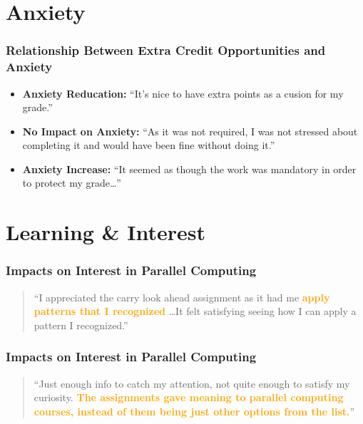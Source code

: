 \documentclass{beamer}
\begin{document}
\section{Anxiety}

\begin{frame}
    \frametitle{Relationship Between Extra Credit Opportunities and Anxiety}

    \begin{figure}
      
    \end{figure}

    \begin{itemize}
      \item \textbf{Anxiety Reducation:}
          ``It's nice to have extra points as a cusion for my grade.''
      \item \textbf{No Impact on Anxiety:}
          ``As it was not required, I was not stressed about completing it and would have been fine without doing it.''
      \item \textbf{Anxiety Increase:}
          ``It seemed as though the work was mandatory in order to protect my grade\ldots''
    \end{itemize}

\end{frame}

\section{Learning \&  Interest}

\begin{frame}
    \frametitle{Impacts on Interest in Parallel Computing}

    \begin{figure}
      
    \end{figure}
    \vfill
    \begin{quote}
      ``I appreciated the carry look ahead assignment as it had me 
      \textcolor{orange}{\textbf{apply
      patterns that I recognized}} \ldots It felt satisfying seeing how I can
      apply a pattern I recognized.''
    \end{quote}
\end{frame}

\begin{frame}
    \frametitle{Impacts on Interest in Parallel Computing}

    \begin{figure}
      
    \end{figure}
    \vfill
    \begin{quote}
      ``Just enough info to catch my attention, not quite enough to satisfy my
      curiosity. \textcolor{orange}{\textbf{The assignments gave meaning to parallel computing courses,
      instead of them being just other options from the list.}}''
    \end{quote}
    \vfill
\end{frame}
\end{document}
